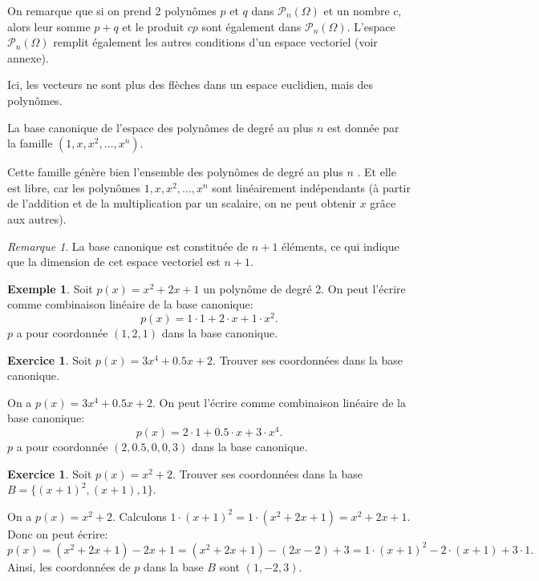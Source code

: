 \documentclass[11pt,a4paper]{article}
\numberwithin{equation}{section}
\theoremstyle{plain}
\theoremstyle{definition}
\newtheorem{example}[theorem]{Exemple}
\newtheorem{exercise}[theorem]{Exercice}
\theoremstyle{remark}
\newtheorem*{remark}{Remarque}
\begin{document}
On remarque que si on prend 2 polynômes \(p\) et \(q\) dans \(\mathcal{P}_n(\Omega)\) et un nombre \(c\), alors leur somme \(p + q\) et le produit \(c p\) sont également dans \(\mathcal{P}_n(\Omega)\).
L'espace \(\mathcal{P}_n(\Omega)\) remplit également les autres conditions d'un espace vectoriel (voir annexe).

Ici, les vecteurs ne sont plus des flèches dans un espace euclidien, mais des polynômes.

La base canonique de l'espace des polynômes de degré au plus \(n\) est donnée par la famille \((1, x, x^2, \ldots, x^n)\).

Cette famille génère bien l'ensemble des polynômes de degré au plus \(n\) . Et elle est libre, car les polynômes \(1, x, x^2, \ldots, x^n\) sont linéairement indépendants (à partir de l'addition et de la multiplication par un scalaire, on ne peut obtenir $x$ grâce aux autres).

\begin{remark}
    La base canonique est constituée de $n+1$ éléments, ce qui indique que la dimension de cet espace vectoriel est $n+1$.
\end{remark}

\begin{example}
    Soit $p(x) = x^2 + 2x + 1$ un polynôme de degré 2. On peut l'écrire comme combinaison linéaire de la base canonique:
    \[
        p(x) = 1 \cdot 1 + 2 \cdot x + 1 \cdot x^2.
    \]
    $p$ a pour coordonnée $(1, 2, 1)$ dans la base canonique.
\end{example}

\begin{exercise}
    Soit $p(x) = 3x^4 + 0.5 x +2$. Trouver ses coordonnées dans la base canonique.
\end{exercise}

\begin{solution}
On a $p(x) = 3x^4 + 0.5 x +2$. On peut l'écrire comme combinaison linéaire de la base canonique:
\[
    p(x) = 2 \cdot 1 + 0.5 \cdot x + 3 \cdot x^4.
\]
$p$ a pour coordonnée $(2, 0.5, 0, 0, 3)$ dans la base canonique.
\end{solution}

\begin{exercise}
    Soit $p(x) = x^2 + 2$. Trouver ses coordonnées dans la base $B = \{(x+1)^2, (x+1), 1\}$.
\end{exercise}
\begin{solution}
    On a $p(x) = x^2 + 2$.
    Calculons $1 \cdot (x+1)^2 = 1 \cdot (x^2 + 2x + 1) = x^2 + 2x + 1$.
    Donc on peut écrire:
    \[
        p(x) = (x^2 + 2x + 1) - 2x + 1 = (x^2 + 2x + 1) - (2x - 2) + 3 = 1 \cdot (x+1)^2 - 2 \cdot (x+1) + 3 \cdot 1.
    \]
    Ainsi, les coordonnées de $p$ dans la base $B$ sont $(1, -2, 3)$.
\end{solution}
\end{document}
